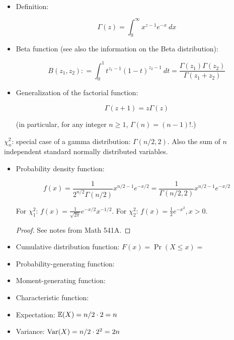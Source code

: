 \begin{proposition}

\

\begin{itemize}

\item Definition:

\[
\Gamma(z) = \int_0^\infty x^{z-1} e^{-x} \ dx
\]

\item Beta function (see also the information on the Beta distribution):

\[
B(z_1, z_2): = \int_0^1 t^{z_1 - 1} (1-t)^{z_2 - 1} \ dt= \frac{ \Gamma(z_1) \Gamma(z_2)}{\Gamma(z_1 + z_2)}
\]

\item Generalization of the factorial function:

\[
\Gamma(z + 1) = z \Gamma(z)
\]

(in particular, for any integer \(n \geq 1\), \(\Gamma(n) = (n-1)!\).)

\end{itemize}

\end{proposition}

\textbf{\(\chi_n^2\)}: special case of a gamma distribution: \(\Gamma(n/2, 2)\). Also the sum of \(n\) independent standard normally distributed variables.

\begin{itemize}

\item Probability density function: 

\[
f(x)  = \frac{1}{2^{n/2}\Gamma(n/2)} x^{n/2 - 1} e^{-x/2} = \frac{1}{\Gamma(n/2, 2)} x^{n/2 - 1} e^{-x/2}
\]

For \(\chi_1^2\): \(f(x) = \frac{1}{\sqrt{2\pi}} e^{-x/2}x^{-1/2} \). For \(\chi_2^2\): \(f(x) = \frac{1}{2}e^{-x^2}, x > 0\). 

\begin{proof} See notes from Math 541A. \end{proof}

\item Cumulative distribution function: \(F(x) = \Pr(X \leq x) = \)

\item Probability-generating function:

\item Moment-generating function:

\item Characteristic function:

\item Expectation: \(\E(X) = n/2 \cdot 2 = n \)

\item Variance: \(\Var(X) = n/2 \cdot 2^2 = 2n\)

\end{itemize}

